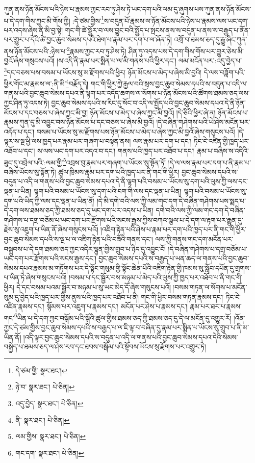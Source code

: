 ཀུན་ནས་ཉོན་མོངས་པའི་ཉེས་པ་རྣམས་ཀྱང་རབ་ཏུ་ཤེས་ཏེ་ཡང་དག་པའི་ལམ་དུ་ཞུགས་པས་ཀུན་ནས་ཉོན་མོངས་པ་དེ་དག་གིས་ཀྱང་མི་གོས་ཀྱི། :དེ་ཙམ་གྱིས་\footnote{དེ་ཙམ་གྱི་  སྣར་ཐང་། }ས་བདུན་པོ་རྣམས་ལ་ཉོན་མོངས་པའི་ཉེས་པ་རྣམས་ལས་ཡང་དག་པར་འདས་ཞེས་ནི་མི་བྱ་སྟེ། གང་གི་ཚེ་སྦྱོར་བ་ལས་བྱུང་བའི་སྤྱོད་པ་སྤངས་ནས་ས་བདུན་པ་ནས་ས་བརྒྱད་པ་ནོན་པར་གྱུར་པ་དེའི་ཚེ་བྱང་ཆུབ་སེམས་དཔའི་ཐེག་པ་རྣམ་པར་དག་པ་ལ་ཞོན་ཏེ། འགྲོ་བ་ཐམས་ཅད་དུ་རྒྱུ་ཞིང་ཀུན་ནས་ཉོན་མོངས་པའི་:ཉེས་པ་\footnote{ཉེ་བ་  སྣར་ཐང་།  པེ་ཅིན། }རྣམས་ཀྱང་རབ་ཏུ་ཤེས་ཏེ། ཤིན་ཏུ་འདས་པས་དེ་དག་གིས་གོས་པར་གྱུར་ཅེས་མི་བྱའོ་ཞེས་གསུངས་པའོ། །ས་འདི་ནི་རྣམ་པར་སྨིན་པ་ལ་མི་གནས་པའི་ཕྱིར་དང་། ལམ་མངོན་པར་:འདུ་བྱེད་པ་\footnote{འདུ་བྱེད་  སྣར་ཐང་།  པེ་ཅིན། }དང་བཅས་པས་བསམ་པ་ཡོངས་སུ་མ་རྫོགས་པའི་ཕྱིར། ཉོན་མོངས་པ་མེད་པ་ཞེས་མི་བྱའི། དེ་ལས་བཟློག་པའི་ཕྱིར་གོང་མ་རྣམས་ལ་:ནི་མི་\footnote{ནི་  སྣར་ཐང་།  པེ་ཅིན། }བརྗོད་དེ། གང་གི་ཕྱིར་ཀྱེ་རྒྱལ་བའི་སྲས་བྱང་ཆུབ་སེམས་དཔའི་ས་བདུན་པ་འདི་ལ་གནས་པའི་བྱང་ཆུབ་སེམས་དཔའ་ནི་ལྷག་པར་འདོད་ཆགས་ལ་སོགས་པ་ཉོན་མོངས་པའི་ཚོགས་ཐམས་ཅད་ལས་ཀྱང་ཤིན་ཏུ་འདས་ཏེ། བྱང་ཆུབ་སེམས་དཔའི་ས་རིང་དུ་སོང་བ་འདི་ལ་སྤྱོད་པའི་བྱང་ཆུབ་སེམས་དཔའ་དེ་ནི་ཉོན་མོངས་པ་དང་བཅས་པ་ཞེས་ཀྱང་མི་བྱ། ཉོན་མོངས་པ་མེད་པ་ཞེས་ཀྱང་མི་བྱའོ། །དེ་ཅིའི་ཕྱིར་ཞེ་ན། ཉོན་མོངས་པ་རྣམས་ཀུན་དུ་མི་འབྱུང་བས་ཉོན་མོངས་པ་དང་བཅས་པ་ཞེས་མི་བྱའོ། །དེ་བཞིན་གཤེགས་པའི་ཡེ་ཤེས་མངོན་པར་འདོད་པ་དང་། བསམ་པ་ཡོངས་སུ་མ་རྫོགས་པས་ཉོན་མོངས་པ་མེད་པ་ཞེས་ཀྱང་མི་བྱའོ་ཞེས་གསུངས་པའོ། །དེ་ལྟར་ས་སྔ་ཕྱི་ལས་ཁྱད་པར་རྣམ་པར་གཞག་པ་བསྟན་ནས། ལས་རྣམ་པར་དག་པ་དང་། ཏིང་ངེ་འཛིན་གྱི་ཁྱད་པར་འཐོབ་པ་དང་། ས་ལས་ཡང་དག་པར་འདའ་བ་དང་། གནས་པའི་ཁྱད་པར་འཐོབ་པ་དང་། རྣམ་པ་བཞིས་ས་འདིའི་ཟུང་དུ་འབྲེལ་པའི་:ལམ་གྱི་\footnote{ལམ་གྱིས་  སྣར་ཐང་།  པེ་ཅིན། }འབྲས་བུ་རྣམ་པར་གཞག་པ་ཡོངས་སུ་སྟོན་ཏོ། །དེ་ལ་ལས་རྣམ་པར་དག་པ་ནི་རྣམ་པ་བཞིས་ཡོངས་སུ་སྟོན་ཏེ། ཚུལ་ཁྲིམས་རྣམ་པར་དག་པའི་ཁྱད་པར་ནི་གང་གི་ཕྱིར། བྱང་ཆུབ་སེམས་དཔའི་ས་བདུན་པ་འདི་ལ་གནས་པའི་བྱང་ཆུབ་སེམས་དཔའ་དེ་ནི་ལྷག་པའི་བསམ་པ་ཡོངས་སུ་དག་པའི་ལུས་ཀྱི་ལས་དང་ལྡན་པ་ཡིན། ལྷག་པའི་བསམ་པ་ཡོངས་སུ་དག་པའི་ངག་གི་ལས་དང་ལྡན་པ་ཡིན། ལྷག་པའི་བསམ་པ་ཡོངས་སུ་དག་པའི་ཡིད་ཀྱི་ལས་དང་ལྡན་པ་ཡིན་ནོ། །དེ་མི་དགེ་བའི་ལས་ཀྱི་ལམ་གང་དག་དེ་བཞིན་གཤེགས་པས་སྨད་པ་དེ་དག་ལས་ཐམས་ཅད་ཀྱི་ཐམས་ཅད་དུ་ཡང་དག་པར་འདས་པ་ཡིན། དགེ་བའི་ལས་ཀྱི་ལམ་གང་དག་དེ་བཞིན་གཤེགས་པ་དགྲ་བཅོམ་པ་ཡང་དག་པར་རྫོགས་པའི་སངས་རྒྱས་ཀྱིས་བཀའ་སྩལ་པ་དེ་དག་ལ་རྟག་པར་རྒྱུན་དུ་རྗེས་སུ་འཇུག་པ་ཡིན་ནོ་ཞེས་གསུངས་པའོ། །འཇིག་རྟེན་པའི་ཤེས་པ་རྣམ་པར་དག་པའི་ཁྱད་པར་ནི་གང་གི་ཕྱིར་བྱང་ཆུབ་སེམས་དཔའི་ས་ལྔ་པ་ལ་འཇིག་རྟེན་པའི་བཟོའི་གནས་དང་། ལས་ཀྱི་གནས་གང་དག་མངོན་པར་བསྒྲུབས་པ་དེ་དག་ཐམས་ཅད་ཀྱང་འདིར་ལྷུན་གྱིས་གྲུབ་པ་ཉིད་དུ་འབྱུང་ངོ། །དེ་བཞིན་གཤེགས་པ་དགྲ་བཅོམ་པ་ཡང་དག་པར་རྫོགས་པའི་སངས་རྒྱས་དང་། བྱང་ཆུབ་སེམས་དཔའི་ས་བརྒྱད་པ་ཡན་ཆད་ལ་གནས་པའི་བྱང་ཆུབ་སེམས་དཔའ་རྣམས་མ་གཏོགས་པར་དེ་སྟོང་གསུམ་གྱི་སྟོང་ཆེན་པོའི་འཇིག་རྟེན་གྱི་ཁམས་སུ་སློབ་དཔོན་དུ་གྲགས་པ་ཡིན་ཏེ་ཞེས་གསུངས་པའོ། །བསམ་པ་དང་སྦྱོར་བས་མཉམ་པ་མེད་པའི་ལུས་ཀྱི་ཁྱད་པར་འཐོབ་པ་ནི་གང་གི་ཕྱིར། དེ་དང་བསམ་པའམ་སྦྱོར་བ་མཉམ་པ་སུ་ཡང་མེད་དོ་ཞེས་གསུངས་པའོ། །བསམ་གཏན་ལ་སོགས་པ་མངོན་སུམ་དུ་བྱེད་པའི་ཁྱད་པར་གྱིས་ནུས་པའི་ཁྱད་པར་འཐོབ་པ་ནི། གང་གི་ཕྱིར་བསམ་གཏན་རྣམས་དང་། ཏིང་ངེ་འཛིན་རྣམས་དང་། སྙོམས་པར་འཇུག་པ་རྣམས་དང་། མངོན་པར་ཤེས་པ་རྣམས་དང་། རྣམ་པར་ཐར་པ་རྣམས་གང་\footnote{གང་དག་  སྣར་ཐང་།  པེ་ཅིན། }ཡིན་པ་དེ་དག་ཀྱང་བསྒོམ་པའི་སྒོའི་ཚུལ་གྱིས་ཐམས་ཅད་ཀྱི་ཐམས་ཅད་དུ་དེ་ལ་མངོན་དུ་འགྱུར་རོ། །འོན་ཀྱང་དེ་ཙམ་གྱིས་བྱང་ཆུབ་སེམས་དཔའི་ས་བརྒྱད་པ་ལ་ཇི་ལྟ་བ་བཞིན་དུ་རྣམ་པར་སྨིན་པ་ཡོངས་སུ་གྲུབ་པ་ནི་མ་ཡིན་ནོ། །འདི་ལྟར་བྱང་ཆུབ་སེམས་དཔའི་ས་བདུན་པ་འདི་ལ་གནས་པའི་བྱང་ཆུབ་སེམས་དཔའ་དེའི་སེམས་བསྐྱེད་པ་ཐམས་ཅད་ལ་ཤེས་རབ་དང་ཐབས་བསྒོམ་པའི་སྟོབས་ཡོངས་སུ་རྫོགས་པར་འགྱུར་ཏེ། 